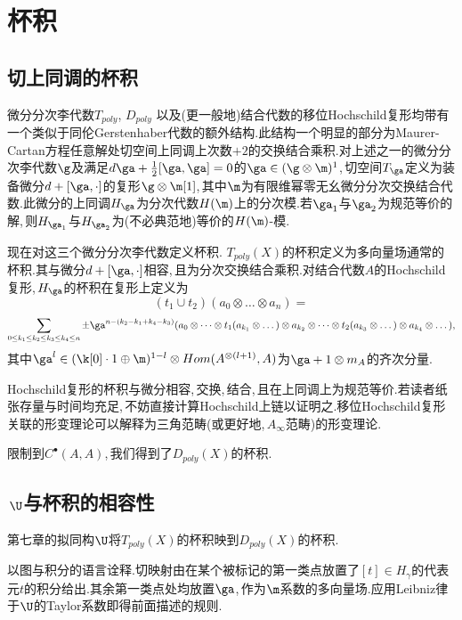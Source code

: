 \chapter{杯积}

\section{切上同调的杯积}
微分分次李代数$T_{poly}$,\,\,$D_{poly}$\,\,以及(更一般地)结合代数的移位Hochschild复形均带有一个类似于同伦Gerstenhaber代数的额外结构.此结构一个明显的部分为Maurer-Cartan方程任意解处切空间上同调上次数$+2$的交换结合乘积.对上述之一的微分分次李代数$\g$及满足$d\ga+{1\over 2}[\ga,\ga]=0$的$\ga \in (\g\otimes \m)^1$,\,切空间$T_{\ga}$定义为装备微分$d+[\ga,\cdot]$的复形$\g \otimes\m[1]$,\,其中$\m$为有限维幂零无幺微分分次交换结合代数.此微分的上同调$H_{\ga}$为分次代数$H(\m)$上的分次模.若$\ga_1$与$\ga_2$为规范等价的解,\,则$H_{\ga_1}$与$H_{\ga_2}$为(不必典范地)等价的$H(\m)$-模.

现在对这三个微分分次李代数定义杯积.\,\,$T_{poly}(X)$的杯积定义为多向量场通常的杯积.其与微分$d+[\ga,\cdot]$相容,\,且为分次交换结合乘积.对结合代数$A$的Hochschild复形,\,$H_{\ga}$的杯积在复形上定义为
$$(t_1\cup t_2)(a_0\otimes\dots\otimes a_n)=$$
$$ \sum_{0\le k_1\le k_2\le k_3\le k_4\le n} \pm \ga^{n-(k_2-k_1+k_4-k_3)}(a_0\otimes\dots \otimes t_1(a_{k_1}\otimes\dots)\otimes a_{k_2}\otimes\dots\otimes t_2(a_{k_3}\otimes\dots)\otimes a_{k_4} \otimes\dots),$$
其中$\ga^{l}\in (\k[0] \cdot 1\oplus\m)^{1-l}\otimes Hom(A^{\otimes (l+1)},A)$为$\ga+1\otimes m_A$的齐次分量.

Hochschild复形的杯积与微分相容,\,交换,\,结合,\,且在上同调上为规范等价.若读者纸张存量与时间均充足,\,不妨直接计算Hochschild上链以证明之.移位Hochschild复形关联的形变理论可以解释为三角范畴(或更好地,\,$A_{\infty}$范畴)的形变理论.

限制到$C^{\bullet}(A,A)$,\,我们得到了$D_{poly}(X)$的杯积.


\section{$\,\U$与杯积的相容性}

\begin{thm}
第七章的拟同构$\U$将$T_{poly}(X)$的杯积映到$D_{poly}(X)$的杯积.
\end{thm}

以图与积分的语言诠释.切映射由在某个被标记的第一类点放置了$[t]\in H_{\gamma}$的代表元$t$的积分给出.其余第一类点处均放置$\ga$,\,作为$\m$系数的多向量场.应用Leibniz律于$\U$的Taylor系数即得前面描述的规则.

